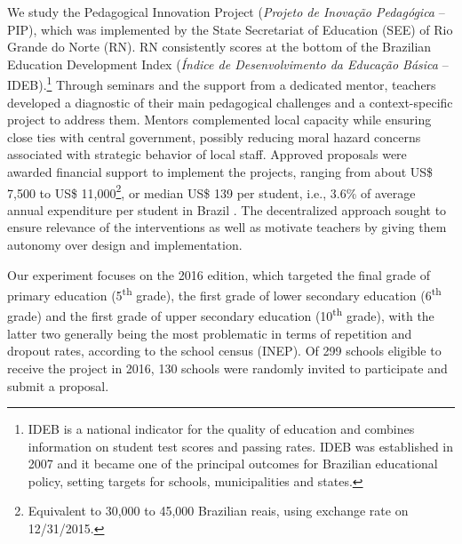 \documentclass[11pt,a4paper]{article}
\begin{document}

We study the Pedagogical Innovation Project (\textit{Projeto de Inovação Pedagógica} -- PIP), which was implemented by the State Secretariat of Education (SEE) of Rio Grande do Norte (RN). RN consistently scores at the bottom of the Brazilian Education Development Index (\textit{Índice de Desenvolvimento da Educação Básica} -- IDEB).\footnote{IDEB is a national indicator for the quality of education and combines information on student test scores and passing rates. IDEB was established in 2007 and it became one of the principal outcomes for Brazilian educational policy, setting targets for schools, municipalities and states.} Through seminars and the support from a dedicated mentor, teachers developed a diagnostic of their main pedagogical challenges and a context-specific project to address them. Mentors complemented local capacity while ensuring close ties with central government, possibly reducing moral hazard concerns associated with strategic behavior of local staff. Approved proposals were awarded financial support to implement the projects, ranging from about US\$ 7,500 to US\$ 11,000\footnote{Equivalent to 30,000 to 45,000 Brazilian reais, using exchange rate on 12/31/2015.}, or median US\$ 139 per student, i.e., 3.6\% of average annual expenditure per student in Brazil \citep{eag-2016}. The decentralized approach sought to ensure relevance of the interventions as well as motivate teachers by giving them autonomy over design and implementation. 

Our experiment focuses on the 2016 edition, which targeted the final grade of primary education (5\textsuperscript{th} grade), the first grade of lower secondary education (6\textsuperscript{th} grade) and the first grade of upper secondary education (10\textsuperscript{th} grade), with the latter two generally being the most problematic in terms of repetition and dropout rates, according to the school census (INEP). Of 299 schools eligible to receive the project in 2016, 130 schools were randomly invited to participate and submit a proposal.

\end{document}
